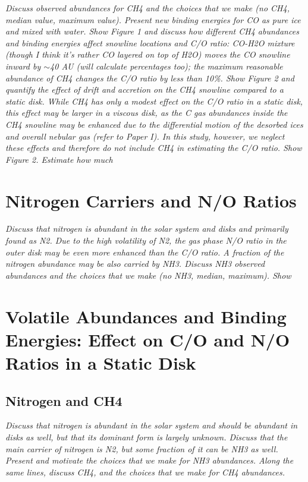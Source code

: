 \documentclass[apj]{emulateapj}
\newcommand{\emgr}[1]{\emph{ \color{gray} #1}}
\begin{document}
\emgr{Discuss observed abundances for CH4 and the choices that we make (no CH4, median value, maximum value). Present new binding energies for CO as pure ice and mixed with water. Show Figure 1 and discuss how different CH4 abundances and binding energies affect snowline locations and C/O ratio: CO-H2O mixture (though I think it's rather CO layered on top of H2O) moves the CO snowline inward by $\sim$40 AU (will calculate percentages too); the maximum reasonable abundance of CH4 changes the C/O ratio by less than 10\%. Show Figure 2 and quantify the effect of drift and accretion on the CH4 snowline compared to a static disk. While CH4 has only a modest effect on the C/O ratio in a static disk, this effect may be larger in a viscous disk, as the C gas abundances inside the CH4 snowline may be enhanced due to the differential motion of the desorbed ices and overall nebular gas (refer to Paper I). In this study, however, we neglect these effects and therefore do not include CH4 in estimating the C/O ratio. Show Figure 2. Estimate how much }

\section{Nitrogen Carriers and N/O Ratios}

\emgr{Discuss that nitrogen is abundant in the solar system and disks and primarily found as N2. Due to the high volatility of N2, the gas phase N/O ratio in the outer disk may be even more enhanced than the C/O ratio. A fraction of the nitrogen abundance may be also carried by NH3. Discuss NH3 observed abundances and the choices that we make (no NH3, median, maximum). Show }

\section{Volatile Abundances and Binding Energies: Effect on C/O and N/O Ratios in a Static Disk}

\subsection{Nitrogen and CH4}

\emgr{Discuss that nitrogen is abundant in the solar system and should be abundant in disks as well, but that its dominant form is largely unknown. Discuss that the main carrier of nitrogen is N2, but some fraction of it can be NH3 as well. Present and motivate the choices that we make for NH3 abundances. Along the same lines, discuss CH4, and the choices that we make for CH4 abundances.}
\end{document}
